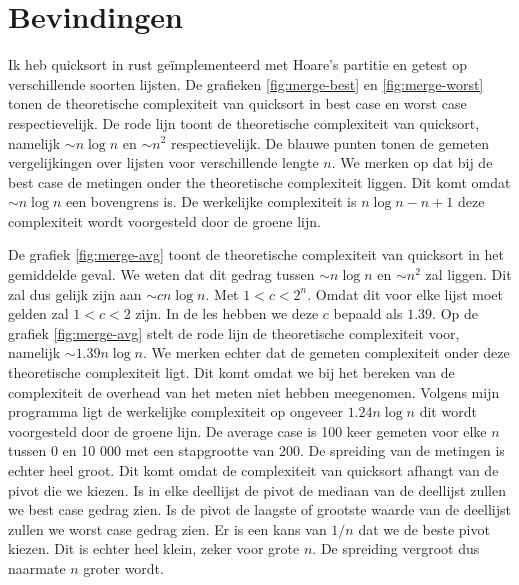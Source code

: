 \documentclass[a4paper]{article}
\begin{document}
\section{Bevindingen}
Ik heb quicksort in rust ge\"implementeerd met Hoare's partitie en getest op verschillende soorten lijsten.
De grafieken \ref{fig:merge-best} en \ref{fig:merge-worst} tonen de theoretische complexiteit van quicksort in best case en worst case respectievelijk.
De rode lijn toont de theoretische complexiteit van quicksort, namelijk $\sim n \log n$ en $\sim n^2$ respectievelijk.
De blauwe punten tonen de gemeten vergelijkingen over lijsten voor verschillende lengte $n$. 
We merken op dat bij de best case de metingen onder the theoretische complexiteit liggen. Dit komt omdat $\sim n \log n$ een bovengrens is.
De werkelijke complexiteit is $n \log n - n + 1$ deze complexiteit wordt voorgesteld door de groene lijn.
\par
De grafiek \ref{fig:merge-avg} toont de theoretische complexiteit van quicksort in het gemiddelde geval.
We weten dat dit gedrag tussen $\sim n \log n$ en $\sim n^2$ zal liggen. Dit zal dus gelijk zijn aan $\sim cn \log n$. Met $1<c<2^n$.
Omdat dit voor elke lijst moet gelden zal $1<c<2$ zijn. In de les hebben we deze $c$ bepaald als $1.39$. Op de grafiek \ref{fig:merge-avg} stelt de rode lijn de theoretische complexiteit voor, namelijk $\sim 1.39n \log n$.
We merken echter dat de gemeten complexiteit onder deze theoretische complexiteit ligt. Dit komt omdat we bij het bereken van de complexiteit de overhead van het meten niet hebben meegenomen.
Volgens mijn programma ligt de werkelijke complexiteit op ongeveer $1.24n \log n$ dit wordt voorgesteld door de groene lijn.
De average case is 100 keer gemeten voor elke $n$ tussen 0 en 10 000 met een stapgrootte van 200.
De spreiding van de metingen is echter heel groot. Dit komt omdat de complexiteit van quicksort afhangt van de pivot die we kiezen.
Is in elke deellijst de pivot de mediaan van de deellijst zullen we best case gedrag zien. Is de pivot de laagste of grootste waarde van de deellijst zullen we worst case gedrag zien.
Er is een kans van $1/n$ dat we de beste pivot kiezen. Dit is echter heel klein, zeker voor grote $n$. De spreiding vergroot dus naarmate $n$ groter wordt.
\end{document}
